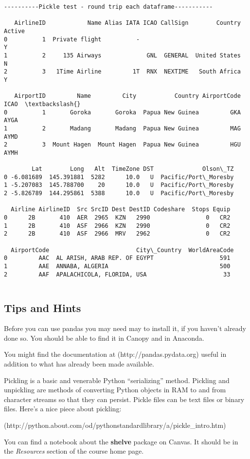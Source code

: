 \documentclass[11pt]{article}
\begin{document}
    \begin{Verbatim}[commandchars=\\\{\}]
----------Pickle test - round trip each dataframe----------- 

   AirlineID            Name Alias IATA ICAO CallSign        Country Active
0          1  Private flight          -                                   Y
1          2     135 Airways             GNL  GENERAL  United States      N
2          3   1Time Airline         1T  RNX  NEXTIME   South Africa      Y 

   AirportID         Name         City           Country AirportCode  ICAO  \textbackslash{}
0          1       Goroka       Goroka  Papua New Guinea         GKA  AYGA   
1          2       Madang       Madang  Papua New Guinea         MAG  AYMD   
2          3  Mount Hagen  Mount Hagen  Papua New Guinea         HGU  AYMH   

        Lat        Long   Alt  TimeZone DST              Olson\_TZ  
0 -6.081689  145.391881  5282      10.0   U  Pacific/Port\_Moresby  
1 -5.207083  145.788700    20      10.0   U  Pacific/Port\_Moresby  
2 -5.826789  144.295861  5388      10.0   U  Pacific/Port\_Moresby   

  Airline AirlineID  Src SrcID Dest DestID Codeshare  Stops Equip
0      2B       410  AER  2965  KZN   2990                0   CR2
1      2B       410  ASF  2966  KZN   2990                0   CR2
2      2B       410  ASF  2966  MRV   2962                0   CR2 

  AirportCode                         City\_Country  WorldAreaCode
0         AAC  AL ARISH, ARAB REP. OF EGYPT                   591
1         AAE  ANNABA, ALGERIA                                500
2         AAF  APALACHICOLA, FLORIDA, USA                      33 


    \end{Verbatim}

    

    \subsection{Tips and Hints}\label{tips-and-hints}

    Before you can use pandas you may need may to install it, if you haven't
already done so. You should be able to find it in Canopy and in
Anaconda.

You might find the documentation at (http://pandas.pydata.org) useful in
addition to what has already been made available.

Pickling is a basic and venerable Python ``serializing'' method.
Pickling and unpickling are methods of converting Python objects in RAM
to and from character streams so that they can persist. Pickle files can
be text files or binary files. Here's a nice piece about pickling:

(http://python.about.com/od/pythonstandardlibrary/a/pickle\_intro.htm)

You can find a notebook about the \textbf{shelve} package on Canvas. It
should be in the \emph{Resources} section of the course home page.


    
    
    
    
\end{document}
